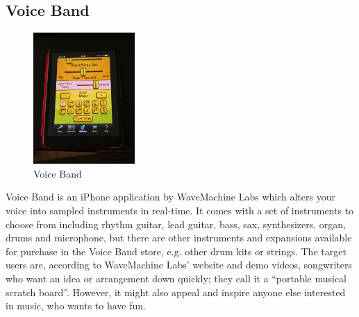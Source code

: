 
\subsection{ Voice Band }
\begin{figure}[h]
	\begin{center}
		\includegraphics[height=5cm]{fig/voiceband.png}
		\caption{Voice Band}
		\label{VoiceBand}
	\end{center}
\end{figure}

Voice Band is an iPhone application by WaveMachine Labs which alters your voice into sampled instruments in real-time. It comes with a set of instruments to choose from including rhythm guitar, lead guitar, bass, sax, synthesizers, organ, drums and microphone, but there are other instruments and expansions available for purchase in the Voice Band store, e.g. other drum kits or strings. The target users are, according to WaveMachine Labs’ website and demo videos, songwriters who want an idea or arrangement down quickly; they call it a “portable musical scratch board”. However, it might also appeal and inspire anyone else interested in music, who wants to have fun. 

